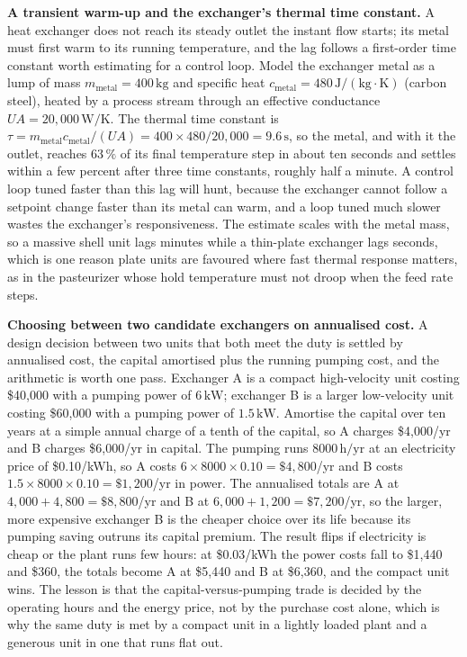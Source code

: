\textbf{A transient warm-up and the exchanger's thermal time constant.} A heat
exchanger does not reach its steady outlet the instant flow starts; its metal must
first warm to its running temperature, and the lag follows a first-order time
constant worth estimating for a control loop. Model the exchanger metal as a lump
of mass $m_{\text{metal}} = 400\,\text{kg}$ and specific heat $c_{\text{metal}} =
480\,\text{J}/(\text{kg}\cdot\si{\kelvin})$ (carbon steel), heated by a process
stream through an effective conductance $UA = 20{,}000\,\text{W}/\si{\kelvin}$. The
thermal time constant is $\tau = m_{\text{metal}} c_{\text{metal}}/(UA) = 400\times
480/20{,}000 = 9.6\,\text{s}$, so the metal, and with it the outlet, reaches
$63\,\%$ of its final temperature step in about ten seconds and settles within a
few percent after three time constants, roughly half a minute. A control loop
tuned faster than this lag will hunt, because the exchanger cannot follow a
setpoint change faster than its metal can warm, and a loop tuned much slower wastes
the exchanger's responsiveness. The estimate scales with the metal mass, so a
massive shell unit lags minutes while a thin-plate exchanger lags seconds, which is
one reason plate units are favoured where fast thermal response matters, as in the
pasteurizer whose hold temperature must not droop when the feed rate steps.

\textbf{Choosing between two candidate exchangers on annualised cost.} A design
decision between two units that both meet the duty is settled by annualised cost,
the capital amortised plus the running pumping cost, and the arithmetic is worth
one pass. Exchanger A is a compact high-velocity unit costing \$40{,}000 with a
pumping power of $6\,\text{kW}$; exchanger B is a larger low-velocity unit costing
\$60{,}000 with a pumping power of $1.5\,\text{kW}$. Amortise the capital over ten
years at a simple annual charge of a tenth of the capital, so A charges
\$4{,}000/yr and B charges \$6{,}000/yr in capital. The pumping runs $8000\,\text{h/yr}$
at an electricity price of \$0.10/kWh, so A costs $6\times 8000\times 0.10 =
\$4{,}800$/yr and B costs $1.5\times 8000\times 0.10 = \$1{,}200$/yr in power. The
annualised totals are A at $4{,}000 + 4{,}800 = \$8{,}800$/yr and B at
$6{,}000 + 1{,}200 = \$7{,}200$/yr, so the larger, more expensive exchanger B is the
cheaper choice over its life because its pumping saving outruns its capital
premium. The result flips if electricity is cheap or the plant runs few hours: at
\$0.03/kWh the power costs fall to \$1{,}440 and \$360, the totals become A at
\$5{,}440 and B at \$6{,}360, and the compact unit wins. The lesson is that the
capital-versus-pumping trade is decided by the operating hours and the energy
price, not by the purchase cost alone, which is why the same duty is met by a
compact unit in a lightly loaded plant and a generous unit in one that runs flat
out.

